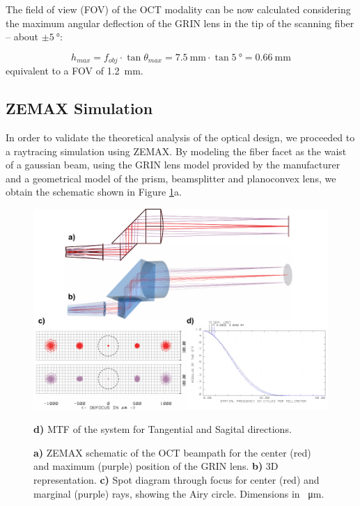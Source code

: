 The field of view (FOV) of the OCT modality can be now calculated considering the maximum angular deflection of the GRIN lens in the tip of the scanning fiber -- about $\pm \SI{5}{\degree}$: 

\begin{equation}
h_{max} = f_{obj}\cdot \tan  \theta_{max} = \SI{7.5}{\milli\meter} \cdot \tan \SI{5}{\degree} = \SI{0.66}{\milli\meter}
\end{equation}
\noindent
equivalent to a FOV of \SI{1.2}{\milli\meter}.



\subsection*{ZEMAX Simulation}

In order to validate the theoretical analysis of the optical design, we proceeded to a raytracing simulation using ZEMAX. By modeling the fiber facet as the waist of a gaussian beam, using the GRIN lens model provided by the manufacturer and a geometrical model of the prism, beamsplitter and planoconvex lens, we obtain the schematic shown in Figure \ref{fig:BS}a. 

\begin{figure}[h!]\centering
      \includegraphics[width=\columnwidth]{figures/30_DesignSimulation/Optical/beamsplitterAll.pdf}
      \caption{\textbf{a)} ZEMAX schematic of the OCT beampath for the center (red) and maximum (purple) position of the GRIN lens.
      \textbf{b)} 3D representation.
      \textbf{c)} Spot diagram through focus for center (red) and marginal (purple) rays, showing the Airy circle. Dimensions in \SI{}{\micro\meter}.}
      \textbf{d)} MTF of the system for Tangential and Sagital directions.
      \label{fig:BS}
\end{figure}

